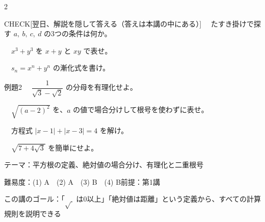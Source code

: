 \documentclass[paper=b5j, fontsize=8pt, fleqn, twoside]{jlreq}
\begin{document}
\begin{multicols*}{2}
  \begin{ptbs}{CHECK}[翌日、解説を隠して答える（答えは本講の中にある）]
    　たすき掛けで探す $a,\ b,\ c,\ d$ の3つの条件は何か。\par
    　$x^3+y^3$ を $x+y$ と $xy$ で表せ。\par
    　$s_n=x^n+y^n$ の漸化式を書け。
  \end{ptbs}

  \notefill
\end{multicols*}

\begin{ascolorbox4A}[出典：オリジナル]{例題2}
  　$\dfrac{1}{\sqrt3-\sqrt2}$ の分母を有理化せよ。\par
  　$\sqrt{(a-2)^2}$ を、$a$ の値で場合分けして根号を使わずに表せ。\par
  　方程式 $|x-1|+|x-3|=4$ を解け。\par
  　$\sqrt{7+4\sqrt3}$ を簡単にせよ。
\end{ascolorbox4A}

\begin{Data}
  テーマ：平方根の定義、絶対値の場合分け、有理化と二重根号\par
  難易度：(1) A　(2) A　(3) B　(4) B\quad 前提：第1講\par
  この講のゴール：「$\sqrt{\ }$ は0以上」「絶対値は距離」という定義から、すべての計算規則を説明できる
\end{Data}
\end{document}
